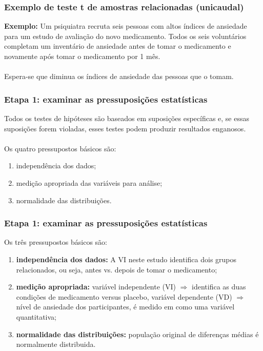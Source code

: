 \documentclass[11pt]{beamer}
\begin{document}
\begin{frame}
\frametitle{Exemplo de teste t de amostras relacionadas (unicaudal)}
\textbf{Exemplo:} Um psiquiatra recruta seis pessoas com altos índices de ansiedade para um estudo de avaliação do novo medicamento. Todos os seis voluntários completam um inventário de ansiedade antes de tomar o medicamento e novamente após tomar o medicamento por 1 mês.\\~\\ 

Espera-se que diminua os índices de ansiedade das pessoas que o tomam.
\end{frame}

\begin{frame}
\frametitle{Etapa 1: examinar as pressuposições estatísticas}

Todos os testes de hipóteses são baseados em suposições específicas e, se essas suposições forem violadas, esses testes podem produzir resultados enganosos.\\~\\
Os quatro pressupostos básicos são:

\begin{enumerate}
\item independência dos dados;
\item medição apropriada das variáveis para análise;
\item normalidade das distribuições.
\end{enumerate}

\end{frame}

\begin{frame}
\frametitle{Etapa 1: examinar as pressuposições estatísticas}

Os três pressupostos básicos são:

\begin{enumerate}
\item \textbf{independência dos dados:} A VI neste estudo identifica dois grupos relacionados, ou seja, antes vs. depois de tomar o medicamento;
\item \textbf{medição apropriada:} variável independente (VI) \(\Rightarrow\) identifica as duas condições de medicamento versus placebo, variável dependente (VD) \(\Rightarrow\) nível de ansiedade dos participantes, é medido em como uma variável quantitativa;
\item \textbf{normalidade das distribuições:} população original de diferenças médias é normalmente distribuida.
\end{enumerate}

\end{frame}
\end{document}
